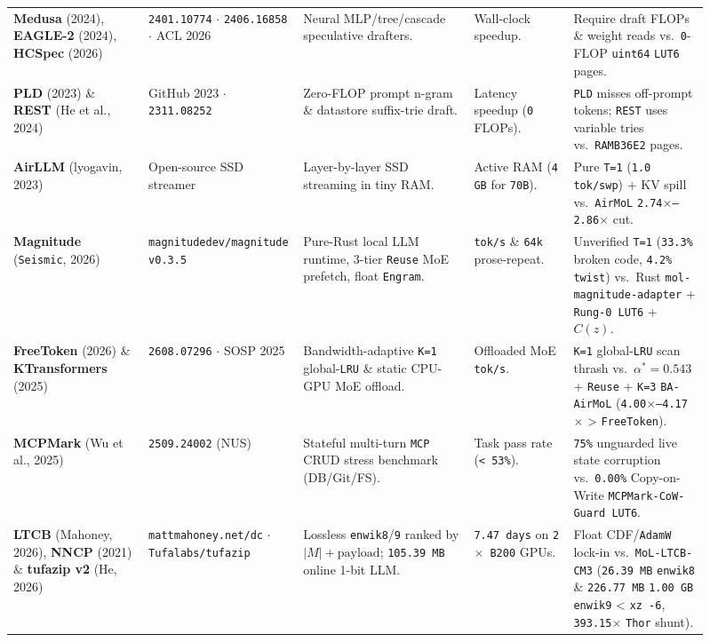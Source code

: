 \documentclass[10pt]{article}
\begin{document}
{\begin{longtable}{@{}L{0.19\linewidth}L{0.15\linewidth}L{0.24\linewidth}L{0.14\linewidth}L{0.19\linewidth}@{}}
\addlinespace[3pt]
\textbf{Medusa} (2024), \textbf{EAGLE-2} (2024), \textbf{HCSpec} (2026) & \texttt{2401.10774} $\cdot$ \texttt{2406.16858} $\cdot$ ACL 2026 & Neural MLP/tree/cascade speculative drafters. & Wall-clock speedup. & Require draft FLOPs \& weight reads vs.\ \texttt{0}-FLOP \texttt{uint64} \texttt{LUT6} pages. \\
\addlinespace[3pt]
\textbf{PLD} (2023) \& \textbf{REST} (He et al., 2024) & GitHub 2023 $\cdot$ \texttt{2311.08252} & Zero-FLOP prompt n-gram \& datastore suffix-trie draft. & Latency speedup (\texttt{0} FLOPs). & \texttt{PLD} misses off-prompt tokens; \texttt{REST} uses variable tries vs.\ \texttt{RAMB36E2} pages. \\
\addlinespace[3pt]
\textbf{AirLLM} (lyogavin, 2023) & Open-source SSD streamer & Layer-by-layer SSD streaming in tiny RAM. & Active RAM (\texttt{4 GB} for \texttt{70B}). & Pure \texttt{T=1} (\texttt{1.0 tok/swp}) + KV spill vs.\ \texttt{AirMoL} \texttt{2.74$\times$--2.86$\times$} cut. \\
\addlinespace[3pt]
\textbf{Magnitude} (\texttt{Seismic}, 2026) & \texttt{magnitudedev/magnitude} \texttt{v0.3.5} & Pure-Rust local LLM runtime, 3-tier \texttt{Reuse} MoE prefetch, float \texttt{Engram}. & \texttt{tok/s} \& \texttt{64k} prose-repeat. & Unverified \texttt{T=1} (\texttt{33.3\%} broken code, \texttt{4.2\%} \texttt{twist}) vs.\ Rust \texttt{mol-magnitude-adapter} + \texttt{Rung-0 LUT6} + $C(z)$. \\
\addlinespace[3pt]
\textbf{FreeToken} (2026) \& \textbf{KTransformers} (2025) & \texttt{2608.07296} $\cdot$ SOSP 2025 & Bandwidth-adaptive \texttt{K=1} global-\texttt{LRU} \& static CPU-GPU MoE offload. & Offloaded MoE \texttt{tok/s}. & \texttt{K=1} global-\texttt{LRU} scan thrash vs.\ $\alpha^*=0.543$ + \texttt{Reuse} + \texttt{K=3} \texttt{BA-AirMoL} (\texttt{4.00$\times$--4.17$\times$} > \texttt{FreeToken}). \\
\addlinespace[3pt]
\textbf{MCPMark} (Wu et al., 2025) & \texttt{2509.24002} (NUS) & Stateful multi-turn \texttt{MCP} CRUD stress benchmark (DB/Git/FS). & Task pass rate (\texttt{< 53\%}). & \texttt{75\%} unguarded live state corruption vs.\ \texttt{0.00\%} Copy-on-Write \texttt{MCPMark-CoW-Guard LUT6}. \\
\addlinespace[3pt]
\textbf{LTCB} (Mahoney, 2026), \textbf{NNCP} (2021) \& \textbf{tufazip v2} (He, 2026) & \texttt{mattmahoney.net/dc} $\cdot$ \texttt{Tufalabs/tufazip} & Lossless \texttt{enwik8}/\texttt{9} ranked by $|M|+\text{payload}$; \texttt{105.39 MB} online 1-bit LLM. & \texttt{7.47 days} on \texttt{2$\times$ B200} GPUs. & Float CDF/\texttt{AdamW} lock-in vs.\ \texttt{MoL-LTCB-CM3} (\texttt{26.39 MB} \texttt{enwik8} \& \texttt{226.77 MB} \texttt{1.00 GB} \texttt{enwik9} < \texttt{xz -6}, \texttt{393.15$\times$} \texttt{Thor} shunt). \\

\end{longtable}}
\end{document}
